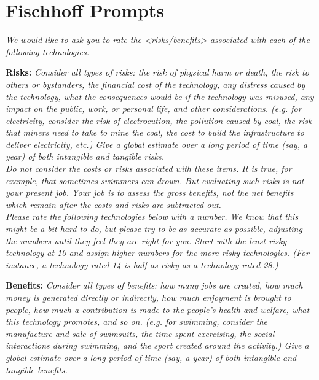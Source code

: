 \documentclass{acm_proc_article-sp}
\begin{document}
\appendix
\section{Fischhoff Prompts}
\label{sec:prompt} 

\textit{We would like to ask you to rate the <risks/benefits> associated with each of the following technologies.}

{\bf Risks:} \textit{Consider all types of risks: the risk of physical harm or death, the risk to others or bystanders, the financial cost of the technology, any distress caused by the technology, what the consequences would be if the technology was misused, any impact on the public, work, or personal life, and other considerations. (e.g. for electricity, consider the risk of electrocution, the pollution caused by coal, the risk that miners need to take to mine the coal, the cost to build the infrastructure to deliver electricity, etc.) Give a global estimate over a long period of time (say, a year) of both intangible and tangible risks.} \\[-.6cm]

\textit{Do not consider the costs or risks associated with these items. It is true, for example, that sometimes swimmers can drown. But evaluating such risks is not your present job. Your job is to assess the gross benefits, not the net benefits which remain after the costs and risks are subtracted out.} \\[-.6cm]

\textit{Please rate the following technologies below with a number. We know that this might be a bit hard to do, but please try to be as accurate as possible, adjusting the numbers until they feel they are right for you. Start with the least risky technology at 10 and assign higher numbers for the more risky technologies. (For instance, a technology rated 14 is half as risky as a technology rated 28.)}

{\bf Benefits:} \textit{Consider all types of benefits: how many jobs are created, how much money is generated directly or indirectly, how much enjoyment is brought to people, how much a contribution is made to the people's health and welfare, what this technology promotes, and so on. (e.g. for swimming, consider the manufacture and sale of swimsuits, the time spent exercising, the social interactions during swimming, and the sport created around the activity.) Give a global estimate over a long period of time (say, a year) of both intangible and tangible benefits.} \\[-.6cm]
\end{document}
